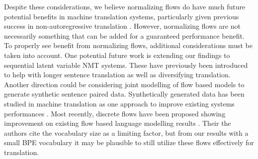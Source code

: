 Despite these considerations, we believe normalizing flows do have much future potential benefits in machine translation systems, particularly given previous success in non-autoregressive translation \cite{flowseq2019Xuezhe}. However, normalizing flows are not necessarily something that can be added for a guaranteed performance benefit. To properly see benefit from normalizing flows, additional considerations must be taken into account. One potential future work is extending our findings to sequential latent variable \ac{NMT} systems. These have previously been introduced to help with longer sentence translation as well as diversifying translation. Another direction could be considering joint modelling of flow based models to generate synthetic sentence paired data. Synthetically generated data has been studied in machine translation as one approach to improve existing systems performances \cite{sennrich2015ImprovingNMT}. Most recently, discrete flows have been proposed showing improvement on existing flow based language modelling results \cite{tran2019discreteflows}. Their the authors cite the vocabulary size as a limiting factor, but from our results with a small \ac{BPE} vocabulary it may be plausible to still utilize these flows effectively for translation. 



 